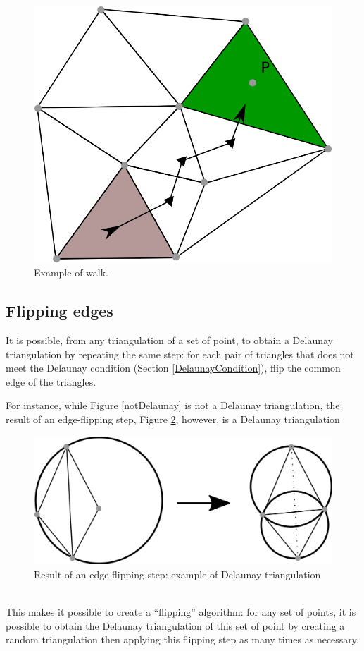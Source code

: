 \documentclass[a4paper,10pt]{article}
\begin{document}
\begin{figure}
  \centering
\includegraphics[scale=1]{Walk}
  \caption{\label{walk} Example of walk.}
\end{figure}


\subsection{Flipping edges}

It is possible, from any triangulation of a set of point, to obtain a Delaunay triangulation by repeating the same step: for each pair of triangles that does not meet the Delaunay condition (Section \ref{DelaunayCondition}), flip the common edge of the triangles.

For instance, while Figure \ref{notDelaunay} is not a Delaunay triangulation, the result of an edge-flipping step, Figure \ref{DelaunayTriangulation}, however, is a Delaunay triangulation
\begin{figure}
\centering
\includegraphics[scale=1]{dessin1}
\caption{\label{DelaunayTriangulation} Result of an edge-flipping step: example of Delaunay triangulation}
\end{figure}\\
This makes it possible to create a ``flipping'' algorithm: for any set of points, it is possible to obtain the Delaunay triangulation of this set of point by creating a random triangulation then applying this flipping step as many times as necessary.
\end{document}
